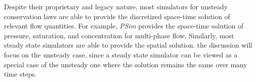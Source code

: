 Despite their proprietary and legacy nature, most simulators for unsteady conservation laws are able to 
provide the discretized space-time solution of relevant flow quantities. 
For example, \textit{PSim} provides the space-time solution of pressure, saturation, and concentration for multi-phase flow.
Similarly, most steady state simulators are able 
to provide the spatial solution. the discussion will focus on the unsteady case, 
since a steady state simulator can be viewed as a special case of the unsteady
one where the solution remains the same over many time steps.\\

